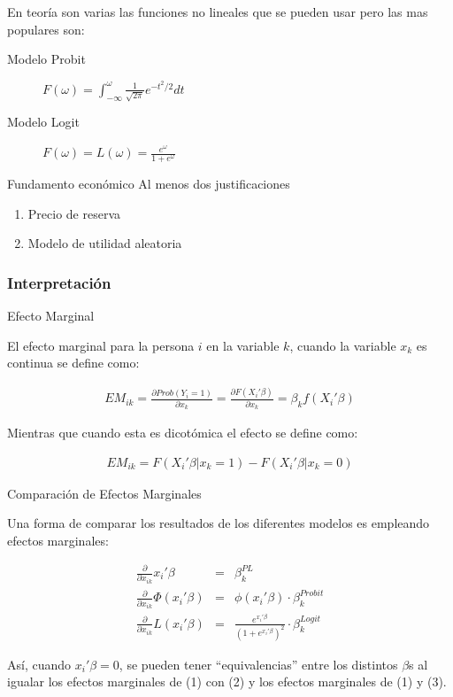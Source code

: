 \begin{frame}
	
	En teoría son varias las funciones no lineales que se
	pueden usar pero las mas populares son:
	\bigskip
	
	\begin{description}
		\item[Modelo Probit] $F(\omega)=\int_{-\infty}^{\omega}\frac{1}{\sqrt{2\pi}}e^{-t^2/2}dt$
		\item[Modelo Logit] $F(\omega)=L(\omega)=\frac{e^{\omega}}{1+e^{\omega}}$
	\end{description}
\end{frame}

\begin{frame}{Fundamento económico}
	Al menos dos justificaciones
	\begin{enumerate}
		\item Precio de reserva
		\item Modelo de utilidad aleatoria
	\end{enumerate}
\end{frame}


\subsubsection{Interpretación}

\begin{frame}{Efecto Marginal}
	
	El efecto marginal para la persona $i$ en la variable $k$, cuando
	la variable $x_k$ es continua se define como:
	
	\begin{eqnarray*}
		EM_{ik}=\frac{\partial Prob(Y_i=1)}{\partial x_k}=\frac{\partial F(X_i'\beta)}{\partial
			x_k}=\beta_k f(X_i'\beta)
	\end{eqnarray*}
	
	Mientras que cuando esta es dicotómica el efecto se define como:
	
	\begin{eqnarray*}
		EM_{ik}=F(X_i'\beta|x_k=1)-F(X_i'\beta|x_k=0)
	\end{eqnarray*}
\end{frame}

\begin{frame}{Comparación de Efectos Marginales}
	
	Una forma de comparar los resultados de los diferentes modelos es
	empleando efectos marginales:
	
	\begin{eqnarray}
		\frac{\partial}{\partial
			x_{ik}}x_i'\beta &=& \beta_k^{PL} \\
		\frac{\partial}{\partial x_{ik}}\Phi(x_i'\beta) &=& \phi(x_i'\beta)\cdot
		\beta_k^{Probit}\\
		\frac{\partial}{\partial x_{ik}}L(x_i'\beta) &=& \frac{e^{x_i'\beta}}{(1+e^{x_i'\beta})^2}\cdot
		\beta_k^{Logit}
	\end{eqnarray}
	
	Así, cuando $x_i'\beta=0$, se pueden tener ``equivalencias'' entre
	los distintos $\beta$s al igualar los efectos marginales de (1)
	con (2) y los efectos marginales de (1) y (3).
\end{frame}

